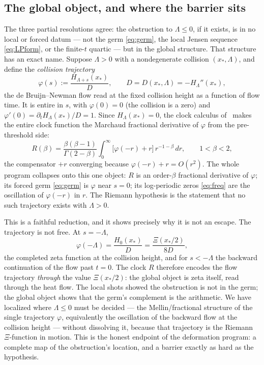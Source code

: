 \documentclass[11pt,reqno]{amsart}
\theoremstyle{plain}
\theoremstyle{definition}
\theoremstyle{remark}
\begin{document}
\subsection{The global object, and where the barrier sits}
\label{subsec:global}
The three partial resolutions agree: the obstruction to $\Lambda\le0$, if it
exists, is in no local or forced datum --- not the germ \eqref{eq:germ}, the
local Jensen sequence \eqref{eq:LPform}, or the finite-$t$ quartic --- but in
the global structure. That structure has an exact name. Suppose $\Lambda>0$
with a nondegenerate collision $(x_*,\Lambda)$, and define the \emph{collision
trajectory}
\begin{equation}\label{eq:traj}
  \varphi(s):=\frac{H_{\Lambda+s}(x_*)}{D},
  \qquad D=D(x_*,\Lambda)=-H_\Lambda''(x_*),
\end{equation}
the de Bruijn--Newman flow read at the fixed collision height as a function
of flow time. It is entire in $s$, with $\varphi(0)=0$ (the collision is a
zero) and $\varphi'(0)=\partial_tH_\Lambda(x_*)/D=1$. Since $H_\Lambda(x_*)=0$,
the clock calculus of~\cite{Fsymbol} makes the entire clock function the
Marchaud fractional derivative of $\varphi$ from the pre-threshold side:
\begin{equation}\label{eq:globalclock}
  R(\beta)=\frac{\beta(\beta-1)}{\Gamma(2-\beta)}\int_0^\infty
  \bigl[\varphi(-r)+r\bigr]\,r^{-1-\beta}\,dr,\qquad 1<\beta<2,
\end{equation}
the compensator $+r$ converging because $\varphi(-r)+r=O(r^2)$. The whole
program collapses onto this one object: $R$ is an order-$\beta$ fractional
derivative of $\varphi$; its forced germ \eqref{eq:germ} is $\varphi$ near
$s=0$; its log-periodic zeros \eqref{eq:freq} are the oscillation of
$\varphi(-r)$ in $r$. The Riemann hypothesis is the statement that no such
trajectory exists with $\Lambda>0$.

This is a faithful reduction, and it shows precisely why it is not an escape.
The trajectory is not free. At $s=-\Lambda$,
\begin{equation}\label{eq:barrier}
  \varphi(-\Lambda)=\frac{H_0(x_*)}{D}=\frac{\Xi(x_*/2)}{8D},
\end{equation}
the completed zeta function at the collision height, and for $s<-\Lambda$ the
backward continuation of the flow past $t=0$. The clock $R$ therefore encodes
the flow trajectory \emph{through} the value $\Xi(x_*/2)$: the global object
is zeta itself, read through the heat flow. The local shots showed the
obstruction is not in the germ; the global object shows that the germ's
complement is the arithmetic. We have localized where $\Lambda\le0$ must be
decided --- the Mellin/fractional structure of the single trajectory
$\varphi$, equivalently the oscillation of the backward flow at the collision
height --- without dissolving it, because that trajectory is the Riemann
$\Xi$-function in motion. This is the honest endpoint of the deformation
program: a complete map of the obstruction's location, and a barrier exactly
as hard as the hypothesis.
\end{document}
